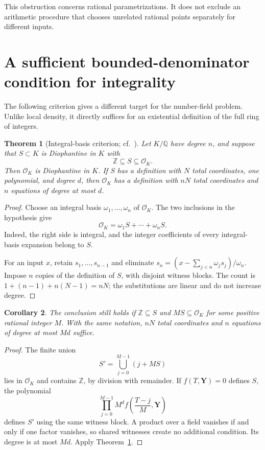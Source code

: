 \documentclass[11pt,a4paper]{article}
\newtheorem{theorem}{Theorem}[section]
\newtheorem{corollary}[theorem]{Corollary}
\theoremstyle{definition}
\newcommand{\Q}{\mathbb Q}\newcommand{\Z}{\mathbb Z}
\newcommand{\OK}{\mathcal O_K}
\begin{document}
This obstruction concerns rational parametrizations. It does not
exclude an arithmetic procedure that chooses unrelated rational
points separately for different inputs.

\section{A sufficient bounded-denominator condition for integrality}

The following criterion gives a different target for the number-field
problem. Unlike local density, it directly suffices for an existential
definition of the full ring of integers.

\begin{theorem}[Integral-basis criterion; cf.\ {\cite[Theorem 4.2(d)]{Poonen}}]\label{thm:sandwich}
Let $K/\Q$ have degree $n$, and suppose that $S\subset K$ is
Diophantine in $K$ with
\[
                           \Z\subseteq S\subseteq\OK.
\]
Then $\OK$ is Diophantine in $K$.
If $S$ has a definition with $N$ total coordinates, one polynomial,
and degree $d$, then $\OK$ has a definition with $nN$ total
coordinates and $n$ equations of degree at most $d$.
\end{theorem}
\begin{proof}
Choose an integral basis $\omega_1,\ldots,\omega_n$ of $\OK$.
The two inclusions in the hypothesis give
\[
                     \OK=\omega_1S+\cdots+\omega_nS.
\]
Indeed, the right side is integral, and the integer coefficients
of every integral-basis expansion belong to $S$.

For an input $x$, retain $s_1,\ldots,s_{n-1}$ and eliminate
$s_n=(x-\sum_{j<n}\omega_js_j)/\omega_n$.
Impose $n$ copies of the definition of $S$, with disjoint witness
blocks. The count is $1+(n-1)+n(N-1)=nN$; the substitutions
are linear and do not increase degree.
\end{proof}

\begin{corollary}\label{cor:bounded-denominators}
The conclusion still holds if $\Z\subseteq S$ and
$MS\subseteq\OK$ for some positive rational integer $M$.
With the same notation, $nN$ total coordinates and $n$ equations
of degree at most $Md$ suffice.
\end{corollary}
\begin{proof}
The finite union
\[
                 S'=\bigcup_{j=0}^{M-1}(j+MS)
\]
lies in $\OK$ and contains $\Z$, by division with remainder.
If $f(T,\mathbf Y)=0$ defines $S$, the polynomial
\[
           \prod_{j=0}^{M-1}M^d
                  f\!\left(\frac{T-j}{M},\mathbf Y\right)
\]
defines $S'$ using the same witness block. A product over a field
vanishes if and only if one factor vanishes, so shared witnesses
create no additional condition. Its degree is at most $Md$.
Apply Theorem~\ref{thm:sandwich}.
\end{proof}
\end{document}
